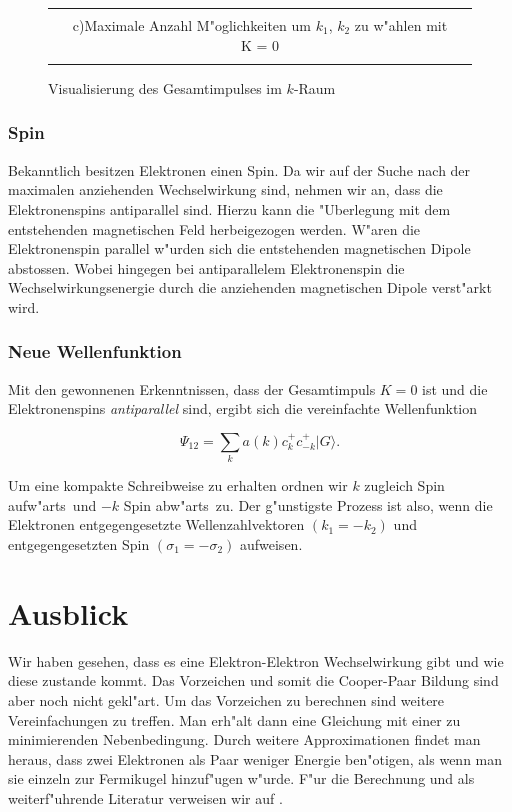 \begin{refsection}
\begin{figure}
\begin{tabular}{l c l}
\begin{minipage}{0.6\textwidth}
    \end{minipage}
    \\
    &
    c)\quad Maximale Anzahl M"oglichkeiten um $k_1$, $k_2$ zu w"ahlen mit K = 0
    \\
    \\
  \end{tabular}
  \caption{Visualisierung des Gesamtimpulses im $k$-Raum
  \label{supraleitung:kRaum}}
\end{figure}

\subsubsection{Spin}
Bekanntlich besitzen Elektronen einen Spin.
Da wir auf der Suche nach der maximalen anziehenden Wechselwirkung sind, nehmen wir an,
dass die Elektronenspins antiparallel sind.
Hierzu kann die "Uberlegung mit dem entstehenden magnetischen Feld herbeigezogen werden.
W"aren die Elektronenspin parallel w"urden sich die entstehenden magnetischen Dipole abstossen.
Wobei hingegen bei antiparallelem Elektronenspin die Wechselwirkungsenergie durch die
anziehenden magnetischen Dipole verst"arkt wird.

\subsubsection{Neue Wellenfunktion}
Mit den gewonnenen Erkenntnissen, dass der Gesamtimpuls $K=0$ ist und die Elektronenspins
{\em antiparallel} sind, ergibt sich die vereinfachte Wellenfunktion

\begin{equation}
\Psi_{12}=\sum \limits_{k} a(k)c^+_{k}c^+_{-k}|G\rangle.
\end{equation}

Um eine kompakte Schreibweise zu erhalten ordnen wir $k$ zugleich \glqq Spin
aufw"arts\grqq~und $-k$ \glqq Spin abw"arts\grqq~zu.
Der g"unstigste Prozess ist also, wenn die Elektronen entgegengesetzte
Wellenzahlvektoren $(k_1 = -k_2)$ und entgegengesetzten Spin $(\sigma_1 = -\sigma_2)$ aufweisen.

\section{Ausblick}
Wir haben gesehen, dass es eine Elektron-Elektron Wechselwirkung gibt und wie diese zustande kommt.
Das Vorzeichen und somit die Cooper-Paar Bildung sind aber noch nicht gekl"art.
Um das Vorzeichen zu berechnen sind weitere Vereinfachungen zu treffen.
Man erh"alt dann eine Gleichung mit einer zu minimierenden Nebenbedingung.
Durch weitere Approximationen findet man heraus,
dass zwei Elektronen als Paar weniger Energie ben"otigen, als wenn man sie einzeln zur Fermikugel
hinzuf"ugen w"urde.
F"ur die Berechnung und als weiterf"uhrende Literatur verweisen wir auf
\cite{supraleitung:madelung1}.

\printbibliography[heading=subbibliography]
\end{refsection}
